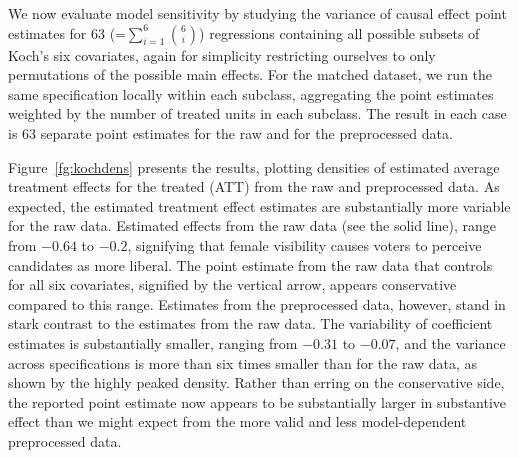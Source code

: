 \documentclass[11pt,titlepage]{article}
\begin{document}
We now evaluate model sensitivity by studying the variance of causal
effect point estimates for 63 (=$\sum_{i=1}^6 {6 \choose i}$)
regressions containing all possible subsets of Koch's six covariates,
again for simplicity restricting ourselves to only permutations of the
possible main effects.  For the matched dataset, we run the same
specification locally within each subclass, aggregating the point
estimates weighted by the number of treated units in each subclass.
The result in each case is 63 separate point estimates for the raw and
for the preprocessed data.

Figure~\ref{fg:kochdens} presents the results, plotting densities of
estimated average treatment effects for the treated (ATT) from the raw
and preprocessed data.  As expected, the estimated treatment effect
estimates are substantially more variable for the raw data.  Estimated
effects from the raw data (see the solid line), range from $-0.64$ to
$-0.2$, signifying that female visibility causes voters to perceive
candidates as more liberal.  The point estimate from the raw data that
controls for all six covariates, signified by the vertical arrow,
appears conservative compared to this range.  Estimates from the
preprocessed data, however, stand in stark contrast to the estimates
from the raw data.  The variability of coefficient estimates is
substantially smaller, ranging from $-0.31$ to $-0.07$, and the
variance across specifications is more than six times smaller than for
the raw data, as shown by the highly peaked density.  Rather than
erring on the conservative side, the reported point estimate now
appears to be substantially larger in substantive effect than we might
expect from the more valid and less model-dependent preprocessed data.
\end{document}
